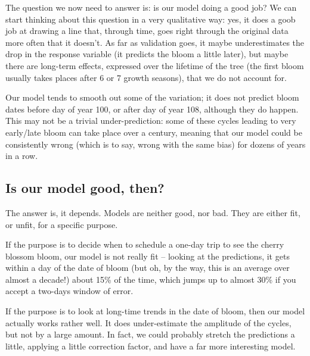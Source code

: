 \documentclass[
  letterpaper,
]{scrbook}
\begin{document}
The question we now need to answer is: is our model doing a good job? We
can start thinking about this question in a very qualitative way: yes,
it does a goob job at drawing a line that, through time, goes right
through the original data more often that it doesn't. As far as
validation goes, it maybe underestimates the drop in the response
variable (it predicts the bloom a little later), but maybe there are
long-term effects, expressed over the lifetime of the tree (the first
bloom usually takes places after 6 or 7 growth seasons), that we do not
account for.


Our model tends to smooth out some of the variation; it does not predict
bloom dates before day of year 100, or after day of year 108, although
they do happen. This may not be a trivial under-prediction: some of
these cycles leading to very early/late bloom can take place over a
century, meaning that our model could be consistently wrong (which is to
say, wrong with the same bias) for dozens of years in a row.

\subsection{Is our model good, then?}\label{sec-crossvalidation-fitness}

The answer is, it depends. Models are neither good, nor bad. They are
either fit, or unfit, for a specific purpose.

If the purpose is to decide when to schedule a one-day trip to see the
cherry blossom bloom, our model is not really fit -- looking at the
predictions, it gets within a day of the date of bloom (but oh, by the
way, this is an average over almost a decade!) about 15\% of the time,
which jumps up to almost 30\% if you accept a two-days window of error.

If the purpose is to look at long-time trends in the date of bloom, then
our model actually works rather well. It does under-estimate the
amplitude of the cycles, but not by a large amount. In fact, we could
probably stretch the predictions a little, applying a little correction
factor, and have a far more interesting model.
\end{document}
